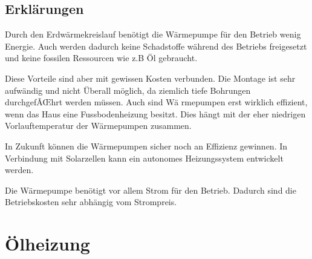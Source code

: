 \subsection{Erklärungen}

Durch den Erdwärmekreislauf benötigt die Wärmepumpe für den Betrieb wenig Energie. Auch werden dadurch keine Schadstoffe während des Betriebs freigesetzt und keine fossilen Ressourcen wie z.B Öl gebraucht.

Diese Vorteile sind aber mit gewissen Kosten verbunden. Die Montage ist sehr aufwändig und nicht Überall möglich, da ziemlich tiefe Bohrungen durchgefÃŒhrt werden müssen. Auch sind Wä
rmepumpen erst wirklich effizient, wenn das Haus eine Fussbodenheizung besitzt. Dies hängt mit der eher niedrigen Vorlauftemperatur der Wärmepumpen zusammen.

In Zukunft können die Wärmepumpen sicher noch an Effizienz gewinnen. In Verbindung mit Solarzellen kann ein autonomes Heizungssystem entwickelt werden.

Die Wärmepumpe benötigt vor allem Strom für den Betrieb. Dadurch sind die Betriebskosten sehr abhängig vom Strompreis. 


\section{Ölheizung}

